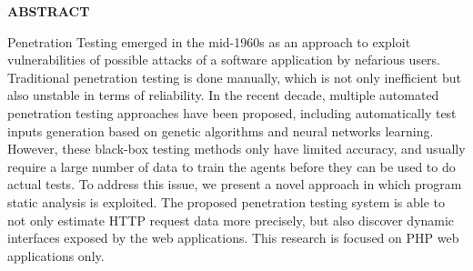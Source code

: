 \clearpage
\begin{centering}
\textbf{ABSTRACT}\\
\vspace{\baselineskip}
\end{centering}

Penetration Testing emerged in the mid-1960s as an approach to exploit vulnerabilities of possible attacks of a software application by nefarious users. Traditional penetration testing is done manually, which is not only inefficient but also unstable in terms of reliability. In the recent decade, multiple automated penetration testing approaches have been proposed, including automatically test inputs generation based on genetic algorithms and neural networks learning. However, these black-box testing methods only have limited accuracy, and usually require a large number of data to train the agents before they can be used to do actual tests. To address this issue, we present a novel approach in which program static analysis is exploited. The proposed penetration testing system is able to not only estimate HTTP request data more precisely, but also discover dynamic interfaces exposed by the web applications. This research is focused on PHP web applications only.


